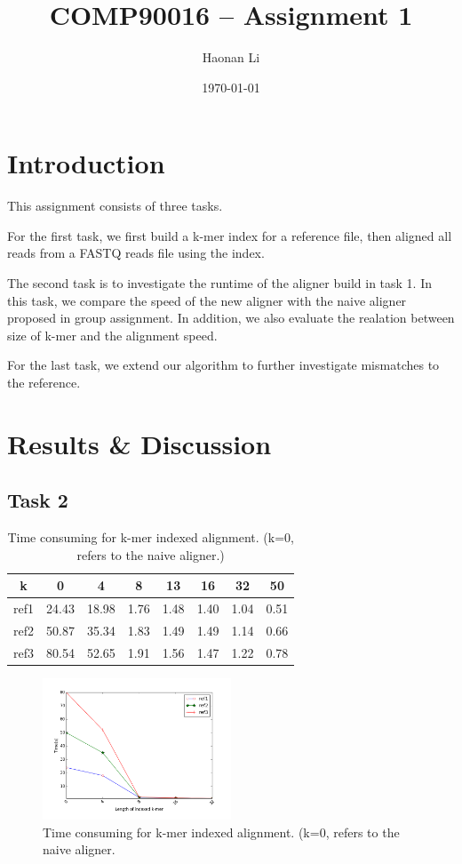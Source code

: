 \documentclass[a4paper]{article}
\title{\bfseries{COMP90016 -- Assignment 1 }}
\author{Haonan Li}
\date{\today}
\begin{document}
\maketitle

\section{Introduction}
\label{sec:introduction}

This assignment consists of three tasks. 

For the first task, we first build a k-mer index for a reference file, then aligned all reads from a FASTQ reads file using the index.

The second task is to investigate the runtime of the aligner build in task 1. In this task, we compare the speed of the new aligner with the naive aligner proposed in group assignment. In addition, we also evaluate the realation between size of k-mer and the alignment speed.

For the last task, we extend our algorithm to further investigate mismatches to the reference.

\section{Results \& Discussion}
\label{sec:experiment}
\subsection{Task 2}

\begin{table}[H]
	\centering
	\begin{tabular}{c|c|c|c|c|c|c|c}
		\hline
		k & 0 & 4 & 8 & 13 & 16 & 32 & 50 \\
		\hline
		ref1 & 24.43 & 18.98 & 1.76 & 1.48 & 1.40 & 1.04 & 0.51 \\
		\hline
		ref2 & 50.87 & 35.34 & 1.83 & 1.49 & 1.49 & 1.14 & 0.66 \\
		\hline
		ref3 & 80.54 & 52.65 & 1.91 & 1.56 & 1.47 & 1.22 & 0.78\\
		\hline
	\end{tabular}
	\caption{\label{tab:1}Time consuming for k-mer indexed alignment. (k=0, refers to  the naive aligner.)}
\end{table}

\begin{figure}[!htb]
	\centering
	\includegraphics[width=0.5\textwidth]{align_time.png}
	\caption{\label{fig:1}Time consuming for k-mer indexed alignment. (k=0, refers to  the naive aligner.}
\end{figure}
\end{document}
